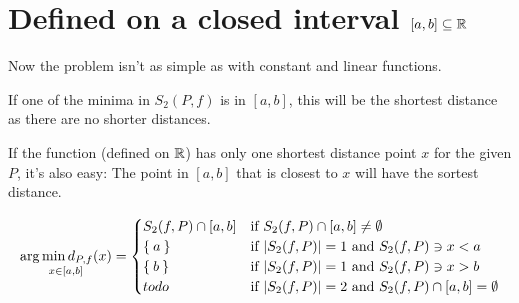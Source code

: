 \section{Defined on a closed interval $[a,b] \subseteq \mathbb{R}$}
Now the problem isn't as simple as with constant and linear
functions.

If one of the minima in $S_2(P,f)$ is in $[a,b]$, this will be the
shortest distance as there are no shorter distances.


If the function (defined on $\mathbb{R}$) has only one shortest distance
point $x$ for the given $P$, it's also easy: The point in $[a,b]$ that
is closest to $x$ will have the sortest distance. 

\[\underset{x\in[a,b]}{\arg \min d_{P,f}(x)} = \begin{cases}
 S_2(f, P) \cap [a,b] &\text{if } S_2(f, P) \cap [a,b] \neq \emptyset \\
              \Set{a} &\text{if } |S_2(f, P)| = 1 \text{ and } S_2(f, P) \ni x < a\\
              \Set{b} &\text{if } |S_2(f, P)| = 1 \text{ and } S_2(f, P) \ni x > b\\
                 todo &\text{if } |S_2(f, P)| = 2 \text{ and } S_2(f, P) \cap [a,b] = \emptyset
    \end{cases}\]
